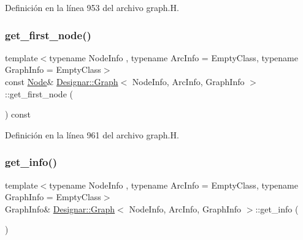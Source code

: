 Definición en la línea 953 del archivo graph.\+H.

\mbox{\label{class_designar_1_1_graph_a2c27cdec559e9773deebec6f1af25a99}} 
\subsubsection{\texorpdfstring{get\+\_\+first\+\_\+node()}{get\_first\_node()}\hspace{0.1cm}{\footnotesize\ttfamily [2/2]}}
{\footnotesize\ttfamily template$<$typename Node\+Info , typename Arc\+Info  = Empty\+Class, typename Graph\+Info  = Empty\+Class$>$ \\
const \hyperlink{class_designar_1_1_graph_a5dfc7dba9d092ac489c72e40390c37d0}{Node}\& \hyperlink{class_designar_1_1_graph}{Designar\+::\+Graph}$<$ Node\+Info, Arc\+Info, Graph\+Info $>$\+::get\+\_\+first\+\_\+node (\begin{DoxyParamCaption}{ }\end{DoxyParamCaption}) const\hspace{0.3cm}{\ttfamily [inline]}}



Definición en la línea 961 del archivo graph.\+H.

\mbox{\label{class_designar_1_1_graph_a5b84c02e86c7887333df2d8934079678}} 
\subsubsection{\texorpdfstring{get\+\_\+info()}{get\_info()}\hspace{0.1cm}{\footnotesize\ttfamily [1/2]}}
{\footnotesize\ttfamily template$<$typename Node\+Info , typename Arc\+Info  = Empty\+Class, typename Graph\+Info  = Empty\+Class$>$ \\
Graph\+Info\& \hyperlink{class_designar_1_1_graph}{Designar\+::\+Graph}$<$ Node\+Info, Arc\+Info, Graph\+Info $>$\+::get\+\_\+info (\begin{DoxyParamCaption}{ }\end{DoxyParamCaption})\hspace{0.3cm}{\ttfamily [inline]}}



